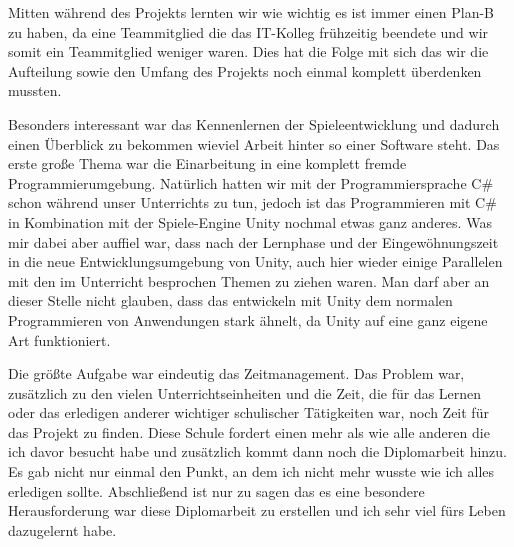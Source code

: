 Mitten während des Projekts lernten wir wie wichtig es ist immer einen Plan-B zu haben, da eine Teammitglied die das IT-Kolleg frühzeitig beendete und wir somit ein Teammitglied weniger waren. Dies hat die Folge mit sich das wir die Aufteilung sowie den Umfang des Projekts noch einmal komplett überdenken mussten. 

Besonders interessant war das Kennenlernen der Spieleentwicklung und dadurch einen Überblick zu bekommen wieviel Arbeit hinter so einer Software steht. Das erste große Thema war die Einarbeitung in eine komplett fremde Programmierumgebung. Natürlich hatten wir mit der Programmiersprache C\# schon während unser Unterrichts zu tun, jedoch ist das Programmieren mit C\# in Kombination mit der Spiele-Engine Unity nochmal etwas ganz anderes. Was mir dabei aber auffiel war, dass nach der Lernphase und der Eingewöhnungszeit in die neue Entwicklungsumgebung von Unity, auch hier wieder einige Parallelen mit den im Unterricht besprochen Themen zu ziehen waren. Man darf aber an dieser Stelle nicht glauben, dass das entwickeln mit Unity dem normalen Programmieren von Anwendungen stark ähnelt, da Unity auf eine ganz eigene Art funktioniert.

Die größte Aufgabe war eindeutig das Zeitmanagement. Das Problem war, zusätzlich zu den vielen Unterrichtseinheiten und die Zeit, die für das Lernen oder das erledigen anderer wichtiger schulischer Tätigkeiten war, noch Zeit für das Projekt zu finden. Diese Schule fordert einen mehr als wie alle anderen die ich davor besucht habe und zusätzlich kommt dann noch die Diplomarbeit hinzu. Es gab nicht nur einmal den Punkt, an dem ich nicht mehr wusste wie ich alles erledigen sollte. 
Abschließend ist nur zu sagen das es eine besondere Herausforderung war diese Diplomarbeit zu erstellen und ich sehr viel fürs Leben dazugelernt habe.
